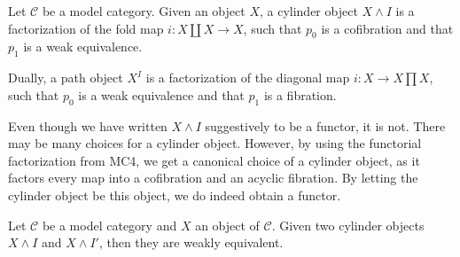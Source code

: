 \documentclass[../thesis.tex]{subfiles}
\begin{document}
            \begin{definition}
                Let $\mathcal{C}$ be a model category. Given an object $X$, a cylinder object $X\wedge I$ is a factorization of the fold map $i:X\coprod X \rightarrow X$, such that $p_0$ is a cofibration and that $p_1$ is a weak equivalence. 
                
                \begin{center}
                \end{center}

                Dually, a path object  $X^{I}$ is a factorization of the diagonal map $i: X \rightarrow X\prod X$, such that $p_0$ is a weak equivalence and that $p_1$ is a fibration.
                
                \begin{center}
                \end{center}
            \end{definition}

            \begin{remark}
                Even though we have written $X\wedge I$ suggestively to be a functor, it is not. There may be many choices for a cylinder object. However, by using the functorial factorization from MC4, we get a canonical choice of a cylinder object, as it factors every map into a cofibration and an acyclic fibration. By letting the cylinder object be this object, we do indeed obtain a functor.
            \end{remark}

            \begin{proposition}
                Let $\mathcal{C}$ be a model category and $X$ an object of $\mathcal{C}$. Given two cylinder objects $X\wedge I$ and $X\wedge I'$, then they are weakly equivalent. 
            \end{proposition}
\end{document}
